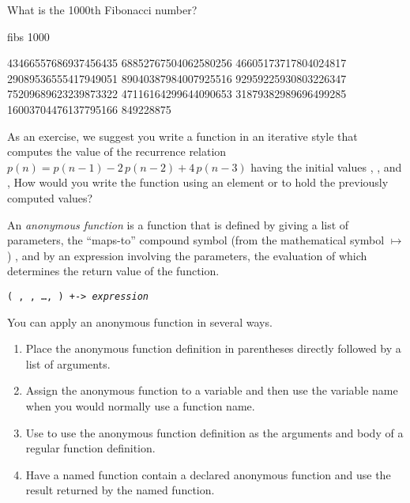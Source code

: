 \begin{xtc}
\begin{xtccomment}
What is the 1000th Fibonacci number?
\end{xtccomment}
\begin{spadsrc}
fibs 1000 
\end{spadsrc}
\begin{TeXOutput}
\begin{fricasmath}{25}
43466557686937456435 68852767504062580256 46605173717804024817 29089536555417949051 89040387984007925516 92959225930803226347 75209689623239873322 47116164299644090653 31879382989696499285 16003704476137795166 849228875%
\end{fricasmath}
\end{TeXOutput}
\end{xtc}

As an exercise, we suggest you write a function in an iterative
style that computes the value of the recurrence relation
$p(n) = p(n-1) - 2 \, p(n-2) + 4 \, p(n-3)$
having the initial values
,
, and
,
How would you write the function using an element
 or 
to hold the previously computed values?


\beginImportant
An {\it anonymous function} is a function that is
defined
by giving a list of parameters, the ``maps-to'' compound
symbol \spadSyntax{+->}%
(from the mathematical symbol $\mapsto$)%
, and by an expression involving the parameters, the evaluation of
which determines the return value of the function.

\begin{center}
{\tt ( , , \ldots,  ) +-> {\it expression}}
\end{center}
\endImportant

You can apply an anonymous function in several ways.
\begin{enumerate}
\item Place the anonymous function definition in parentheses
directly followed by a list of arguments.
\item Assign the anonymous function to a variable and then
use the variable name when you would normally use a function name.
\item Use \spadSyntax{==} to use the anonymous function definition as
the arguments and body of a regular function definition.
\item Have a named function contain a declared anonymous function and
use the result returned by the named function.
\end{enumerate}

